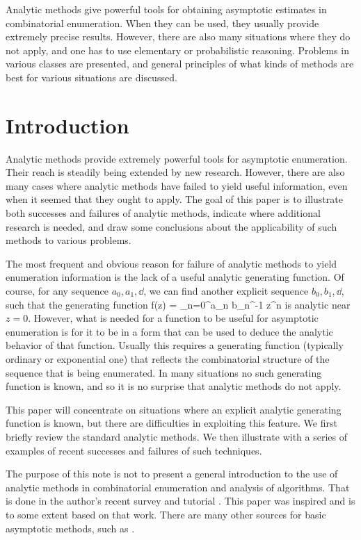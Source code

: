 Analytic methods give powerful tools for obtaining asymptotic estimates
in combinatorial enumeration.
When they can be used, they usually provide extremely precise results.
However, there are also many situations where they do not apply, and
one has to use elementary or probabilistic reasoning.
Problems in various classes are presented, and general
principles of what kinds of methods are best for various situations are
discussed.

\vspace*{.1in}
\section{Introduction}
\hsp
Analytic methods provide extremely powerful tools for asymptotic enumeration.
Their reach is steadily being extended by new research.
However, there are also many cases where analytic methods
have failed to yield useful
information,
even when it seemed that they ought to apply.
The goal of this paper is to illustrate both successes and failures of analytic
methods, indicate where additional research is needed, and draw some
conclusions about the applicability of such methods to various problems.

The most frequent and obvious reason for failure of analytic methods to yield enumeration information is the lack of a useful analytic generating function.
Of course, for any sequence $a_0 , a_1 , \dd$, we can find another explicit sequence
$b_0, b_1 , \dd$, such that the generating function
f(z) = \sum_{n=0}^\In a_n b_n^{-1} z^n
\eeq
is analytic near $z=0$.
However, what is needed for a function to be useful for
asymptotic enumeration is for it to be in a form that can be used to 
deduce the analytic behavior of that function.
Usually this requires a generating function (typically ordinary or exponential
one) that reflects the combinatorial structure of the sequence
that is being enumerated.
In many situations no such generating function is known, and so it is no surprise that analytic methods do not apply.

This paper will concentrate on situations where an explicit
analytic generating function is known,
but there are difficulties in exploiting this feature.
We first briefly review the standard analytic methods.
We then illustrate with a series of examples of recent successes and failures
of such techniques.

The purpose of this note is not to present a general introduction
to the use of analytic methods in combinatorial
enumeration and analysis of algorithms.
That is done in the author's recent survey and tutorial \cite{AMO5}.
This paper was inspired and is to some extent based on that
work.
There are many other sources for basic asymptotic methods,
such as \cite{Bender74,BenWil,NGB,Egor84,Erdelyi,Fed89a,Flajolet92,GrKnPa89,GK,HaPa73,Hofri,Kemp84,DEK,DEK1,DEK2,Mahmoud,ViFl90,Wilf90,Wyman}.
